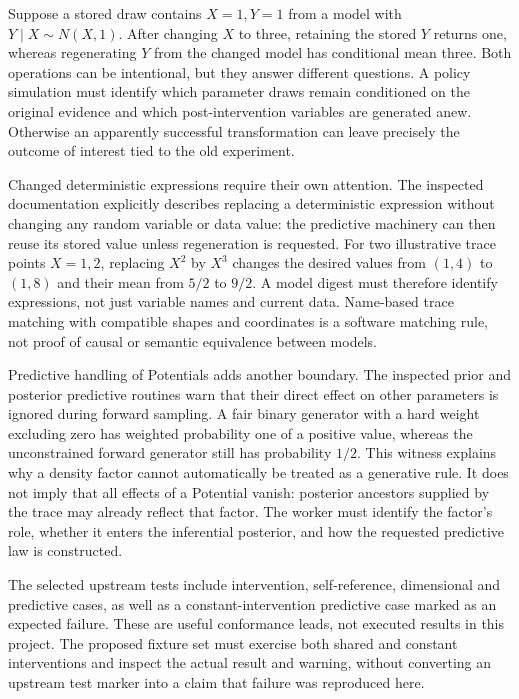 Suppose a stored draw contains $X=1,Y=1$ from a model with
$Y\mid X\sim N(X,1)$. After changing $X$ to three, retaining the stored $Y$
returns one, whereas regenerating $Y$ from the changed model has conditional
mean three. Both operations can be intentional, but they answer different
questions. A policy simulation must identify which parameter draws remain
conditioned on the original evidence and which post-intervention variables
are generated anew. Otherwise an apparently successful transformation can
leave precisely the outcome of interest tied to the old experiment.
\citep{exec23_pymc_sources,exec23_pymc_reference}

Changed deterministic expressions require their own attention. The inspected
documentation explicitly describes replacing a deterministic expression without
changing any random variable or data value: the predictive machinery can then
reuse its stored value unless regeneration is requested. For two illustrative
trace points $X=1,2$, replacing $X^2$ by $X^3$ changes the desired values from
$(1,4)$ to $(1,8)$ and their mean from $5/2$ to $9/2$. A model digest must
therefore identify expressions, not just variable names and current data.
Name-based trace matching with compatible shapes and coordinates is a software
matching rule, not proof of causal or semantic equivalence between models.
\citep{exec23_pymc_sources,exec23_pymc_reference}

Predictive handling of Potentials adds another boundary. The inspected prior
and posterior predictive routines warn that their direct effect on other
parameters is ignored during forward sampling. A fair binary generator with
a hard weight excluding zero has weighted probability one of a positive value,
whereas the unconstrained forward generator still has probability $1/2$.
This witness explains why a density factor cannot automatically be treated
as a generative rule. It does not imply that all effects of a Potential vanish:
posterior ancestors supplied by the trace may already reflect that factor.
The worker must identify the factor's role, whether it enters the inferential
posterior, and how the requested predictive law is constructed.
\citep{exec23_pymc_sources,exec23_pymc_reference}

The selected upstream tests include intervention, self-reference, dimensional
and predictive cases, as well as a constant-intervention predictive case marked
as an expected failure. These are useful conformance leads, not executed results
in this project. The proposed fixture set must exercise both shared and constant
interventions and inspect the actual result and warning, without converting
an upstream test marker into a claim that failure was reproduced here.
\citep{exec23_pymc_sources}

